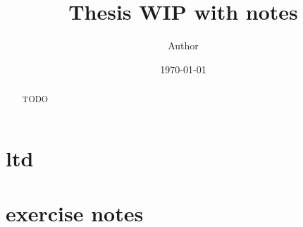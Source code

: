 \documentclass{article}
\numberwithin{equation}{section}
\numberwithin{algorithm}{section}
\begin{document}

\title{Thesis WIP with notes}
\author{Author}
\date{\today}
\maketitle

\clearpage

\begin{abstract}
TODO
\end{abstract}
\clearpage

\setcounter{tocdepth}{2}
\tableofcontents

\clearpage
\section{ltd}


\section{exercise notes}
\end{document}
